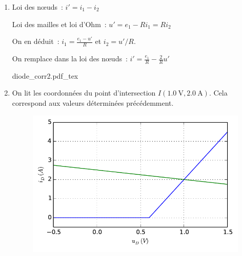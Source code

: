 \documentclass[a4paper, 10pt, garamond, oneside]{book}
\begin{document}
{\begin{enumerate}
		      On remarque que $u_D>u_s$, donc la diode est bien passante.

		      Pour trouver $i_D$ on utilise la caractéristique de la diode~:
		      \[
			      \boxed{i_D=au_D+b=5\times 0,67-3=\SI{2.0}{\ampere}}
		      \]

		\item Loi des nœuds~: $i'=i_1-i_2$

		      Loi des mailles et loi d'Ohm~: $u'=e_1-Ri_1=Ri_2$

		      On en déduit~: $i_1=\frac{e_1-u'}{R}$ et $i_2=u'/R$.

		      On remplace dans la loi des nœuds~:
		      $\boxed{i'=\frac{e_1}{R}-\frac{2}{R}u'}$

		      \begin{center}
			      {diode_corr2.pdf_tex}
		      \end{center}
		\item On lit les coordonnées du point d'intersection
		      $I(\SI{1.0}{\volt},\SI{2.0}{\ampere})$. Cela correspond aux valeurs
		      déterminées précédemment.
		      \begin{figure}[htbp]
			      \centering
			      \includegraphics[scale=1]{diode_annexecorr}
		      \end{figure}
	\end{enumerate}
}

\newpage
\end{document}
